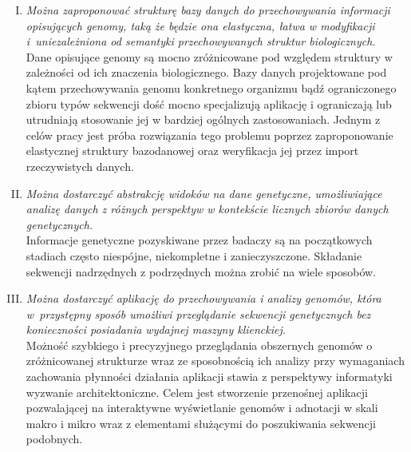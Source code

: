
\begin{enumerate}[I.]
	\item \textit{
		Można zaproponować strukturę bazy danych do przechowywania informacji opisujących genomy, taką że będzie ona elastyczna, łatwa w modyfikacji i~uniezależniona od semantyki przechowywanych struktur biologicznych.
		} \\
	\break
	Dane opisujące genomy są mocno zróżnicowane pod względem struktury w zależności od ich znaczenia biologicznego. Bazy danych projektowane pod kątem przechowywania genomu konkretnego organizmu bądź ograniczonego zbioru typów sekwencji dość mocno specjalizują aplikację i ograniczają lub utrudniają stosowanie jej w bardziej ogólnych zastosowaniach. Jednym z celów pracy jest próba rozwiązania tego problemu poprzez zaproponowanie elastycznej struktury bazodanowej oraz weryfikacja jej przez import rzeczywistych danych.\\
	
	\item \textit{
		Można dostarczyć abstrakcję widoków na dane genetyczne, umożliwiające analizę danych z różnych perspektyw w kontekście licznych zbiorów
		danych genetycznych.
		} \\
	\break
	Informacje genetyczne pozyskiwane przez badaczy są na początkowych stadiach często niespójne, niekompletne i zanieczyszczone. 
	Składanie sekwencji nadrzędnych z podrzędnych można zrobić na wiele sposobów. 
	
	\break
	\item \textit{
		Można dostarczyć aplikację do przechowywania i analizy genomów, która w~przystępny sposób umożliwi przeglądanie sekwencji genetycznych bez konieczności posiadania wydajnej maszyny klienckiej. 
		} \\
		\break
	Możność szybkiego i precyzyjnego przeglądania obszernych genomów o zróżnicowanej strukturze wraz ze sposobnością ich analizy przy wymaganiach zachowania płynności działania aplikacji stawia z perspektywy informatyki wyzwanie architektoniczne. Celem jest stworzenie przenośnej aplikacji pozwalającej na interaktywne wyświetlanie genomów i adnotacji w skali makro i mikro wraz z elementami służącymi do poszukiwania sekwencji podobnych.
	
\end{enumerate}

